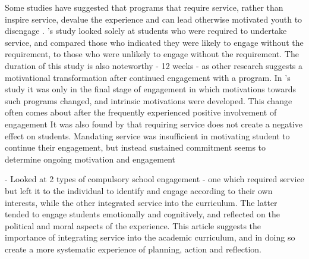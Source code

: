 Some studies have suggested that programs that require service, rather than inspire service, devalue the experience and can lead otherwise motivated youth to disengage \citep[see][]{Stukas1999}. \citeauthor{Stukas1999}'s \citeyearpar{Stukas1999} study looked solely at students who were required to undertake service, and compared those who indicated they were likely to engage without the requirement, to those who were unlikely to engage without the requirement. The duration of this study is also noteworthy - 12 weeks - as other research suggests a motivational transformation after continued engagement with a program. %
In \citeauthor{Pearce2006}'s \citeyearpar{Pearce2006} study it was only in the final stage of engagement in which motivations towards such programs changed, and intrinsic motivations were developed. This change often comes about after the frequently experienced positive involvement of engagement %
It was also found by \citet{Henderson2007} that requiring service does not create a negative effect on students. Mandating service was insufficient in motivating student to continue their engagement, but instead sustained commitment seems to determine ongoing motivation and engagement \citep{Henderson2007}

 \citep{McLellan2003} - Looked at 2 types of compulsory school engagement - one which required service but left it to the individual to identify and engage according to their own interests, while the other integrated service into the curriculum. The latter tended to engage students emotionally and cognitively, and reflected on the political and moral aspects of the experience. This article suggests the importance of integrating service into the academic curriculum, and in doing so create a more systematic experience of planning, action and reflection. 

